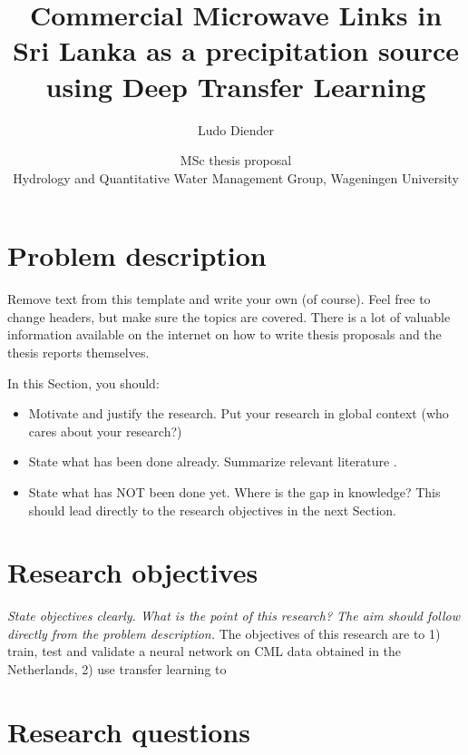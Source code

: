 \documentclass[twocolumn, 10pt, a4paper]{article}
\begin{document}
	
	\title{\vspace{-1cm}\Huge{Commercial Microwave Links in Sri Lanka as a precipitation source using Deep Transfer Learning}}
	\author{\Large{Ludo Diender}}
	\date{\normalsize{MSc thesis proposal\\
			Hydrology and Quantitative Water Management Group,
			Wageningen University}}
	
	\maketitle
	
	\section{Problem description}
	
	Remove text from this template and write your own (of course). Feel free to change headers, but make sure the topics are covered. There is a lot of valuable information available on the internet on how to write thesis proposals and the thesis reports themselves. 
	
	In this Section, you should:
	\begin{itemize}
		\item Motivate and justify the research. Put your research in global context (who cares about your research?)
		\item State what has been done already. Summarize relevant literature \cite{Overeem2011}.
		\item State what has NOT been done yet. Where is the gap in knowledge? This should lead directly to the research objectives in the next Section.
	\end{itemize}
	
	\section{Research objectives}
	
	\textit{State objectives clearly. What is the point of this research? The aim should follow directly from the problem description.}
	The objectives of this research are to 1) train, test and validate a neural network on CML data obtained in the Netherlands, 2) use transfer learning to 
	 
	
	\section{Research questions}
	
\end{document}
